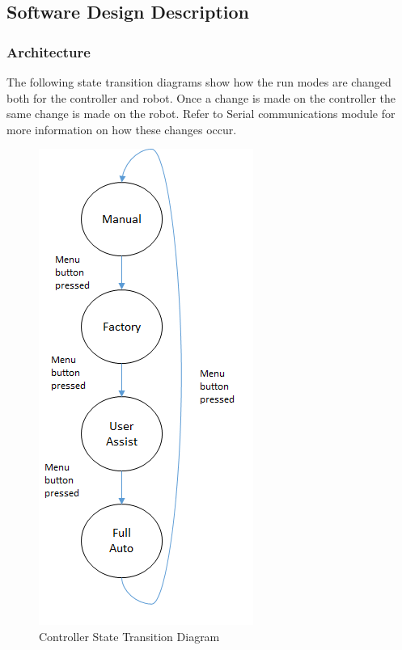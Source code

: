 \documentclass{article}
\begin{document}
\subsection{Software Design Description}
\subsubsection{Architecture}

The following state transition diagrams show how the run modes are changed both for the controller and robot. Once a change is made on the controller the same change is made on the robot. Refer to Serial communications module for more information on how these changes occur. 
	\begin{figure}[h]
		\includegraphics[scale=0.5]{controller_std.png}
		\centering
		\caption{Controller State Transition Diagram}
	\end{figure}
	
\end{document}
